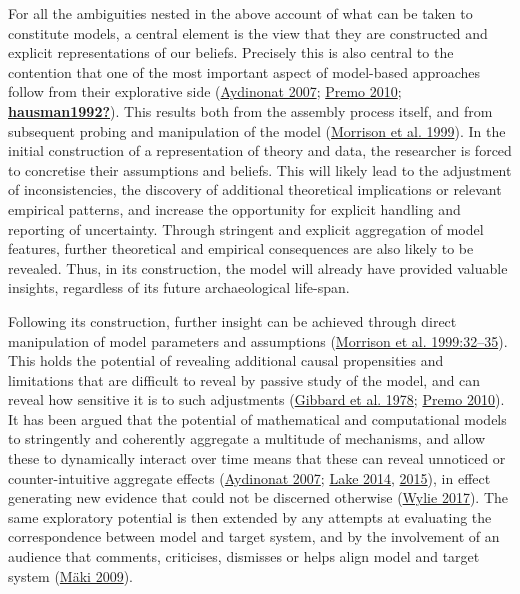 \documentclass[
  a4paper,
  oneside]{uiophdthesis}
\begin{document}
For all the ambiguities nested in the above account of what can be taken to constitute models, a central element is the view that they are constructed and explicit representations of our beliefs. Precisely this is also central to the contention that one of the most important aspect of model-based approaches follow from their explorative side (\protect\hyperlink{ref-aydinonat2007}{Aydinonat 2007}; \protect\hyperlink{ref-premo2010}{Premo 2010}; \protect\hyperlink{ref-hausman1992}{\textbf{hausman1992?}}). This results both from the assembly process itself, and from subsequent probing and manipulation of the model (\protect\hyperlink{ref-morrison1999}{Morrison et al. 1999}). In the initial construction of a representation of theory and data, the researcher is forced to concretise their assumptions and beliefs. This will likely lead to the adjustment of inconsistencies, the discovery of additional theoretical implications or relevant empirical patterns, and increase the opportunity for explicit handling and reporting of uncertainty. Through stringent and explicit aggregation of model features, further theoretical and empirical consequences are also likely to be revealed. Thus, in its construction, the model will already have provided valuable insights, regardless of its future archaeological life-span.

Following its construction, further insight can be achieved through direct manipulation of model parameters and assumptions (\protect\hyperlink{ref-morrison1999}{Morrison et al. 1999:32--35}). This holds the potential of revealing additional causal propensities and limitations that are difficult to reveal by passive study of the model, and can reveal how sensitive it is to such adjustments (\protect\hyperlink{ref-gibbard1978}{Gibbard et al. 1978}; \protect\hyperlink{ref-premo2010}{Premo 2010}). It has been argued that the potential of mathematical and computational models to stringently and coherently aggregate a multitude of mechanisms, and allow these to dynamically interact over time means that these can reveal unnoticed or counter-intuitive aggregate effects (\protect\hyperlink{ref-aydinonat2007}{Aydinonat 2007}; \protect\hyperlink{ref-lake2014}{Lake 2014}, \protect\hyperlink{ref-lake2015}{2015}), in effect generating new evidence that could not be discerned otherwise (\protect\hyperlink{ref-wylie2017}{Wylie 2017}). The same exploratory potential is then extended by any attempts at evaluating the correspondence between model and target system, and by the involvement of an audience that comments, criticises, dismisses or helps align model and target system (\protect\hyperlink{ref-muxe4ki2009}{Mäki 2009}).
\end{document}
